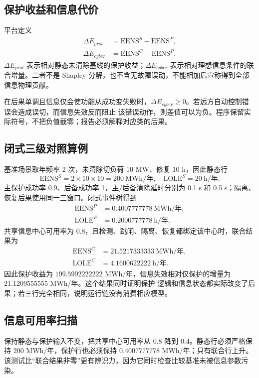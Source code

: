 \subsection{保护收益和信息代价}
平台定义
\begin{align}
 \Delta E_{prot}&=\mathrm{EENS}^{S}-\mathrm{EENS}^{P},\\
 \Delta E_{cyber}&=\mathrm{EENS}^{C}-\mathrm{EENS}^{P}.
\end{align}
$\Delta E_{prot}$ 表示相对静态未清除基线的保护收益；$\Delta E_{cyber}$ 表示相对理想信息条件的联合增量。二者不是 Shapley
分解，也不含无故障误动，不能相加后宣称得到全部信息物理贡献。

在后果单调且信息仅会使功能从成功变失败时，$\Delta E_{cyber}\ge0$。若远方自动控制错误会造成误切，而信息失效反而阻止
该错误动作，则差值可以为负。程序保留实际符号，不把负值截零；报告必须解释对应类的后果。

\subsection{闭式三级对照算例}
基准场景取年频率 2 次，未清除切负荷 10 MW、修复 10 h，因此静态行
\begin{equation}
 \mathrm{EENS}^{S}=2\times10\times10=200\ \text{MWh/年},
 \quad \mathrm{LOLE}^{S}=20\ \text{h/年}.
\end{equation}
主保护成功率 0.9、后备成功率 1，主/后备清除延时分别为 0.1 s 和 0.5 s；隔离、恢复后果使用同一三窗口。闭式事件树得到
\begin{align}
 \mathrm{EENS}^{P}&=0.4007777778\ \text{MWh/年},\\
 \mathrm{LOLE}^{P}&=0.2000777778\ \text{h/年}.
\end{align}
共享信息中心可用率为 0.8，且检测、跳闸、隔离、恢复都绑定该中心时，联合结果为
\begin{align}
 \mathrm{EENS}^{C}&=21.5217333333\ \text{MWh/年},\\
 \mathrm{LOLE}^{C}&=4.1600622222\ \text{h/年}.
\end{align}
因此保护收益为 $199.5992222222$ MWh/年，信息失效相对仅保护的增量为 $21.1209555555$ MWh/年。这个结果同时证明保护
逻辑和信息状态都实际改变了后果；若三行完全相同，说明运行链没有消费相应模型。

\subsection{信息可用率扫描}
保持静态与保护输入不变，把共享中心可用率从 0.8 降到 0.4。静态行必须严格保持 200 MWh/年，保护行也必须保持
$0.4007777778$ MWh/年；只有联合行上升。该测试比“联合结果非零”更有辨识力，因为它同时检查比较基准未被信息参数污染。

